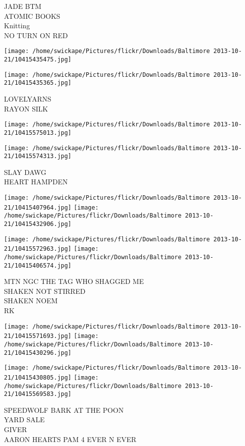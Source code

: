 \documentclass[10pt,letterpaper]{article}
\begin{document}
JADE BTM\\
ATOMIC BOOKS\\
Knitting\\
NO TURN ON RED
\pagebreak

\texttt{[image: /home/swickape/Pictures/flickr/Downloads/Baltimore 2013-10-21/10415435475.jpg]}

\vspace{0.25in}
\texttt{[image: /home/swickape/Pictures/flickr/Downloads/Baltimore 2013-10-21/10415435365.jpg]}

LOVELYARNS\\
RAYON SILK
\pagebreak

\texttt{[image: /home/swickape/Pictures/flickr/Downloads/Baltimore 2013-10-21/10415575013.jpg]}

\vspace{0.25in}
\texttt{[image: /home/swickape/Pictures/flickr/Downloads/Baltimore 2013-10-21/10415574313.jpg]}

SLAY DAWG\\
HEART HAMPDEN
\pagebreak

\texttt{[image: /home/swickape/Pictures/flickr/Downloads/Baltimore 2013-10-21/10415407964.jpg]}
\texttt{[image: /home/swickape/Pictures/flickr/Downloads/Baltimore 2013-10-21/10415432906.jpg]}

\texttt{[image: /home/swickape/Pictures/flickr/Downloads/Baltimore 2013-10-21/10415572963.jpg]}
\texttt{[image: /home/swickape/Pictures/flickr/Downloads/Baltimore 2013-10-21/10415406574.jpg]}

MTN NGC THE TAG WHO SHAGGED ME\\
SHAKEN NOT STIRRED\\
SHAKEN NOEM\\
RK
\pagebreak

\texttt{[image: /home/swickape/Pictures/flickr/Downloads/Baltimore 2013-10-21/10415571693.jpg]}
\texttt{[image: /home/swickape/Pictures/flickr/Downloads/Baltimore 2013-10-21/10415430296.jpg]}

\texttt{[image: /home/swickape/Pictures/flickr/Downloads/Baltimore 2013-10-21/10415430805.jpg]}
\texttt{[image: /home/swickape/Pictures/flickr/Downloads/Baltimore 2013-10-21/10415569583.jpg]}

SPEEDWOLF BARK AT THE POON\\
YARD SALE\\
GIVER\\
AARON HEARTS PAM 4 EVER N EVER
\pagebreak
\end{document}
